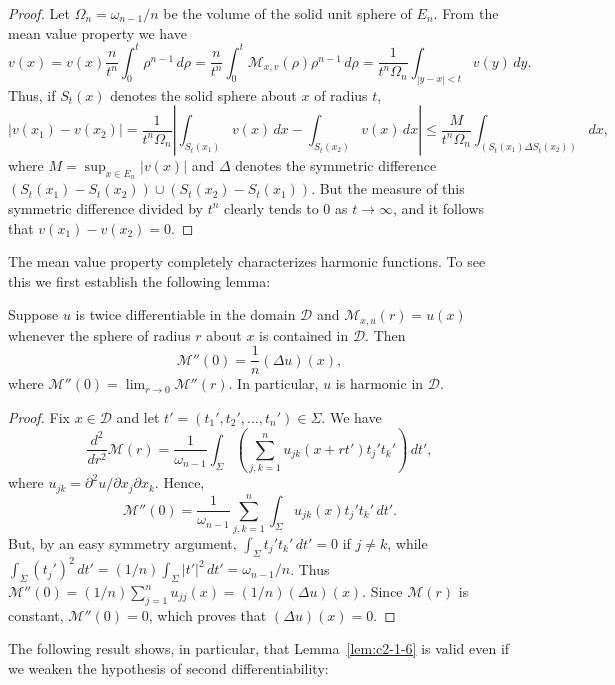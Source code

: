 \begin{proof}
Let $\Omega_n = \omega_{n-1}/n$ be the volume of the solid unit sphere of $E_n$. From the mean value property we have
\[
v(x) = v(x) \frac{n}{t^n} \int_0^t \rho^{n-1}\,d\rho = \frac{n}{t^n} \int_0^t \mathcal{M}_{x,v}(\rho) \rho^{n-1}\,d\rho = \frac{1}{t^n \Omega_n} \int_{|y-x| < t} v(y)\,dy.
\]
Thus, if $S_t(x)$ denotes the solid sphere about $x$ of radius $t$,
\[
|v(x_1) - v(x_2)| = \frac{1}{t^n \Omega_n} \left| \int_{S_t(x_1)} v(x)\,dx - \int_{S_t(x_2)} v(x)\,dx \right| \leq \frac{M}{t^n \Omega_n} \int_{(S_t(x_1) \Delta S_t(x_2))} dx,
\]
where $M = \sup_{x \in E_n} |v(x)|$ and $\Delta$ denotes the symmetric difference $(S_t(x_1) - S_t(x_2)) \cup (S_t(x_2) - S_t(x_1))$. But the measure of this symmetric difference divided by $t^n$ clearly tends to $0$ as $t \to \infty$, and it follows that $v(x_1) - v(x_2) = 0$.
\end{proof}

The mean value property completely characterizes harmonic functions. To see this we first establish the following lemma:

\begin{lemma}\label{lem:c2-1-6}
Suppose $u$ is twice differentiable in the domain $\mathcal{D}$ and $\mathcal{M}_{x,u}(r) = u(x)$ whenever the sphere of radius $r$ about $x$ is contained in $\mathcal{D}$. Then
\[
\mathcal{M}''(0) = \frac{1}{n} (\Delta u)(x),
\]
where $\mathcal{M}''(0) = \lim_{r \to 0} \mathcal{M}''(r)$. In particular, $u$ is harmonic in $\mathcal{D}$.
\end{lemma}

\begin{proof}
Fix $x \in \mathcal{D}$ and let $t' = (t_1', t_2', \dots, t_n') \in \Sigma$. We have
\[
\frac{d^2}{dr^2} \mathcal{M}(r) = \frac{1}{\omega_{n-1}} \int_{\Sigma} \left( \sum_{j,k=1}^n u_{jk}(x + rt') t_j' t_k' \right)\,dt',
\]
where $u_{jk} = \partial^2 u / \partial x_j \partial x_k$. Hence,
\[
\mathcal{M}''(0) = \frac{1}{\omega_{n-1}} \sum_{j,k=1}^n \int_{\Sigma} u_{jk}(x) t_j' t_k'\,dt'.
\]
But, by an easy symmetry argument, $\int_{\Sigma} t_j' t_k'\,dt' = 0$ if $j \neq k$, while $\int_{\Sigma} (t_j')^2\,dt' = (1/n) \int_{\Sigma} |t'|^2\,dt' = \omega_{n-1}/n$. Thus $\mathcal{M}''(0) = (1/n) \sum_{j=1}^n u_{jj}(x) = (1/n)(\Delta u)(x)$. Since $\mathcal{M}(r)$ is constant, $\mathcal{M}''(0) = 0$, which proves that $(\Delta u)(x) = 0$.
\end{proof}

The following result shows, in particular, that Lemma~\ref{lem:c2-1-6} is valid even if we weaken the hypothesis of second differentiability:

